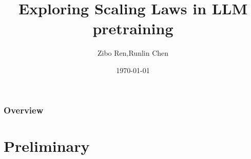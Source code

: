 \documentclass{beamer}
\title[Scaling Laws]{
    Exploring Scaling Laws in LLM pretraining
}
\author{Zibo Ren,Runlin Chen} %
\institute[PKU] %
{
    Peking University \\ %
    \medskip
    \textit{2200010626@stu.pku.edu.cn,2200010848@stu.pku.edu.cn} %
}
\date{\today} %
\begin{document}
    \begin{frame}
        \titlepage %
    \end{frame}

    \begin{frame}
        \frametitle{Overview} %
        \tableofcontents %
    \end{frame}



    \section{Preliminary}\label{sec:preliminary}

    \begin{frame}

    \end{frame}
\end{document}
